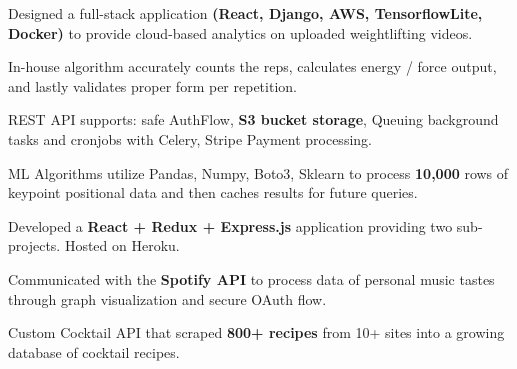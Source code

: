 

\begin{cventries}

  \cventry
    {
    } %
    {} %
    {} %
    {} %
    {
      \begin{cvitems} %
        \item {Designed a full-stack application \textbf{(React, Django, AWS, TensorflowLite, Docker)} to provide cloud-based analytics on uploaded weightlifting videos.}
        \item{In-house algorithm accurately counts the reps, calculates energy / force output, and lastly validates proper form per repetition.}
        \item{REST API supports: safe AuthFlow, \textbf{S3 bucket storage}, Queuing background tasks and cronjobs with Celery, Stripe Payment processing.}
        \item{ML Algorithms utilize Pandas, Numpy, Boto3, Sklearn to process \textbf{10,000} rows of keypoint positional data and then caches results for future queries.}
      \end{cvitems}
    }

\cventry
    {
    }
    {}
    {}
    {}
    {
     \begin{cvitems} %
        \item {Developed a \textbf{React + Redux + Express.js} application providing two sub-projects. Hosted on Heroku.}
        \item{Communicated with the \textbf{Spotify API} to process data of personal music tastes through graph visualization and secure OAuth flow.}
        \item{Custom Cocktail API that scraped \textbf{800+ recipes} from 10+ sites into a growing database of cocktail recipes.}
      \end{cvitems}
    }


\end{cventries}

